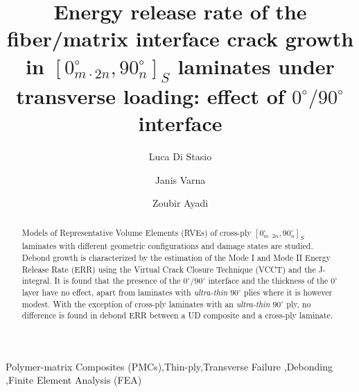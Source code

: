 \documentclass[review]{elsarticle}
\begin{document}
\begin{frontmatter}

\title{Energy release rate of the fiber/matrix interface crack growth in $\left[0_{m\cdot2n}^{\circ},90_{n}^{\circ}\right]_{S}$ laminates under transverse loading: effect of $0^{\circ}/90^{\circ}$ interface}


\author[nancy,lulea]{Luca Di Stasio}
\author[lulea]{Janis Varna}
\author[nancy]{Zoubir Ayadi}


\address[nancy]{Universit\'e de Lorraine, EEIGM, IJL, 6 Rue Bastien Lepage, F-54010 Nancy, France}
\address[lulea]{Lule\aa\ University of Technology, University Campus, SE-97187 Lule\aa, Sweden}

\begin{abstract}
\noindent
Models of Representative Volume Elements (RVEs) of cross-ply $\left[0_{m\cdot2n}^{\circ},90_{n}^{\circ}\right]_{S}$ laminates with different geometric configurations and damage states are studied. Debond growth is characterized by the estimation of the Mode I and Mode II Energy Release Rate (ERR) using the Virtual Crack Closure Technique (VCCT) and the J-integral. It is found that the presence of the $0^{\circ}/90^{\circ}$ interface and the thickness of the $0^{\circ}$ layer have no effect, apart from laminates with \emph{ultra-thin} $90^{\circ}$ plies where it is however modest. With the exception of cross-ply laminates with an \emph{ultra-thin} $90^{\circ}$ ply, no difference is found in debond ERR between a UD composite and a cross-ply laminate.
\end{abstract}

\begin{keyword}
Polymer-matrix Composites (PMCs)\sep Thin-ply\sep Transverse Failure \sep Debonding \sep Finite Element Analysis (FEA)
\end{keyword}


\end{frontmatter}
\end{document}
